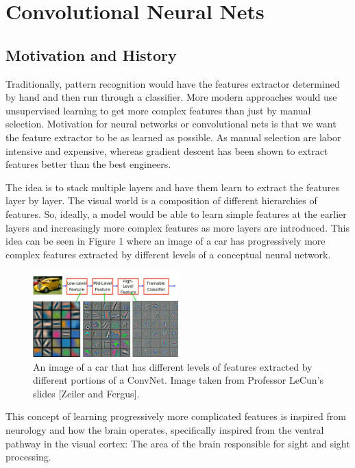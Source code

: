 \chapter{Convolutional Neural Nets}

\section{Motivation and History}

Traditionally, pattern recognition would have the features extractor determined by hand and then run through a classifier.
More modern approaches would use unsupervised learning to get more complex features than just by manual selection.
Motivation for neural networks or convolutional nets is that we want the feature extractor to be as learned as possible.
As manual selection are labor intensive and expensive, whereas gradient descent has been shown to extract features better than the best engineers.

The idea is to stack multiple layers and have them learn to extract the features layer by layer.
The visual world is a composition of different hierarchies of features.
So, ideally, a model would be able to learn simple features at the earlier layers and increasingly more complex features 
as more layers are introduced.
This idea can be seen in Figure 1 where an image of a car has progressively more complex features extracted by different
levels of a conceptual neural network.

\begin{figure}[ht]
\centering
\includegraphics[width=0.5\textwidth]{figs/FeatureExtraction.png}
\caption{An image of a car that has different levels of features extracted by different portions of a ConvNet.
Image taken from Professor LeCun's slides [Zeiler and Fergus].}
\end{figure}

This concept of learning progressively more complicated features is inspired from neurology and how the brain operates, specifically inspired from the ventral pathway in the visual cortex: The area of the brain responsible for sight and sight processing.

